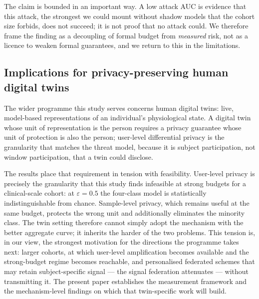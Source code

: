 The claim is bounded in an important way. A low attack AUC is evidence that this
attack, the strongest we could mount without shadow models that the cohort size
forbids, does not succeed; it is not proof that no attack could. We therefore
frame the finding as a decoupling of formal budget from \emph{measured} risk, not
as a licence to weaken formal guarantees, and we return to this in the
limitations.

\subsection{Implications for privacy-preserving human digital twins}
\label{sec:disc-hdt}

The wider programme this study serves concerns human digital twins: live,
model-based representations of an individual's physiological state. A digital
twin whose unit of representation is the person requires a privacy guarantee
whose unit of protection is also the person; user-level differential privacy is
the granularity that matches the threat model, because it is subject
participation, not window participation, that a twin could disclose.

The results place that requirement in tension with feasibility. User-level
privacy is precisely the granularity that this study finds infeasible at strong
budgets for a clinical-scale cohort: at $\varepsilon = 0.5$ the four-class model
is statistically indistinguishable from chance. Sample-level privacy, which
remains useful at the same budget, protects the wrong unit and additionally
eliminates the minority class. The twin setting therefore cannot simply adopt the
mechanism with the better aggregate curve; it inherits the harder of the two
problems. This tension is, in our view, the strongest motivation for the
directions the programme takes next: larger cohorts, at which user-level
amplification becomes available and the strong-budget regime becomes reachable,
and personalised federated schemes that may retain subject-specific signal ---
the signal federation attenuates --- without transmitting it. The present paper
establishes the measurement framework and the mechanism-level findings on which
that twin-specific work will build.
